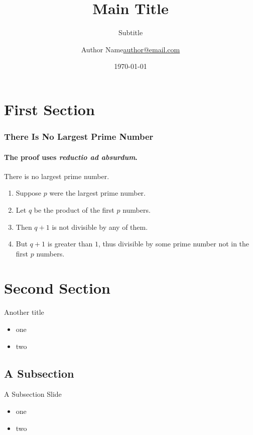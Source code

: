 \documentclass{beamer}
\title{Main Title}
\subtitle{Subtitle}
\date{\today}
\author{\texorpdfstring{Author Name\newline\url{author@email.com}}{Author Name}}
\institute{Affiliation}
\begin{document}
	\begin{frame}[plain]
		\titlepage
	\end{frame}
	
	
	\section{First Section}
	\begin{frame} 
		\frametitle{There Is No Largest Prime Number} 
		\framesubtitle{The proof uses \textit{reductio ad absurdum}.} 
		\begin{theorem}
			There is no largest prime number. \end{theorem} 
		\begin{enumerate} 
			\item<1-| alert@1> Suppose $p$ were the largest prime number. 
			\item<2-> Let $q$ be the product of the first $p$ numbers. 
			\item<3-> Then $q+1$ is not divisible by any of them. 
			\item<1-> But $q + 1$ is greater than $1$, thus divisible by some prime
			number not in the first $p$ numbers.
		\end{enumerate}
	\end{frame}
	
	\section{Second Section}
	\begin{frame}{Another title}
		\begin{itemize}
			\item one
			\item two
		\end{itemize}
	\end{frame}
	
	\subsection{A Subsection}
	\begin{frame}{A Subsection Slide}
		\begin{itemize}
			\item one
			\item two
		\end{itemize}
	\end{frame}
\end{document}
